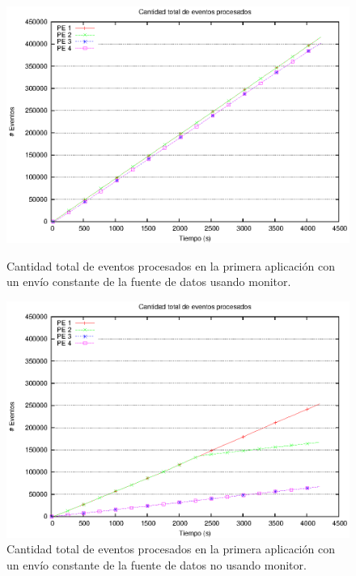 \begin{figure}[ht]
\centering

\begin{minipage}[c]{0.45\textwidth}
\centering
    \includegraphics[width=\textwidth]{images/exp/app1/uniform/cm/eventCount.eps}
    \caption{Cantidad total de eventos procesados en la primera aplicación con un envío constante de la fuente de datos usando monitor.}
    \label{fig:app1-uniform-eventCount-cm}
\end{minipage} \hspace*{1cm}
\begin{minipage}[c]{0.45\textwidth}
\centering
    \includegraphics[width=\textwidth]{images/exp/app1/uniform/sm/eventCount.eps}
    \caption{Cantidad total de eventos procesados en la primera aplicación con un envío constante de la fuente de datos no usando monitor.}
    \label{fig:app1-uniform-eventCount-sm}
\end{minipage}

\end{figure}

